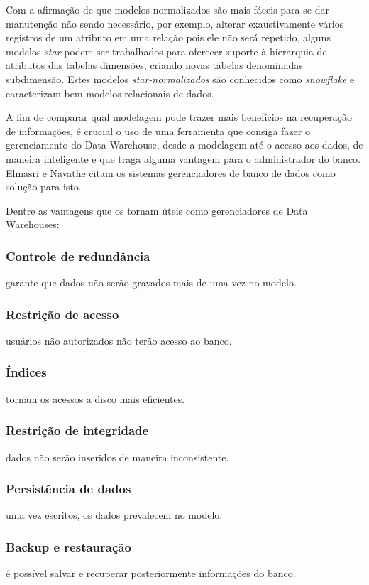 \documentclass[conference]{IEEEtran}
\begin{document}
Com a afirmação de que modelos normalizados são mais fáceis para se dar manutenção não sendo necessário, por exemplo, alterar exaustivamente vários registros de um atributo em uma relação pois ele não será repetido, alguns modelos \textit{star} podem ser trabalhados para oferecer suporte à hierarquia de atributos das tabelas dimensões, criando novas tabelas denominadas subdimensão. Estes modelos \textit{star-normalizados} são conhecidos como \textit{snowflake} e caracterizam bem modelos relacionais de dados.

A fim de comparar qual modelagem pode trazer mais benefícios na recuperação de informações, é crucial o uso de uma ferramenta que consiga fazer o gerenciamento do Data Warehouse, desde a modelagem até o acesso aos dados, de maneira inteligente e que traga alguma vantagem para o administrador do banco. Elmasri e Navathe \cite{navathe2011banco} citam os sistemas gerenciadores de banco de dados como solução para isto.

Dentre as vantagens que os tornam úteis como gerenciadores de Data Warehouses:

\subsubsection{Controle de redundância} garante que dados não serão gravados mais de uma vez no modelo.
\subsubsection{Restrição de acesso} usuários não autorizados não terão acesso ao banco.
\subsubsection{Índices} tornam os acessos a disco mais eficientes.
\subsubsection{Restrição de integridade} dados não serão inseridos de maneira inconsistente.
\subsubsection{Persistência de dados} uma vez escritos, os dados prevalecem no modelo.
\subsubsection{Backup e restauração} é possível salvar e recuperar posteriormente informações do banco.
\end{document}
